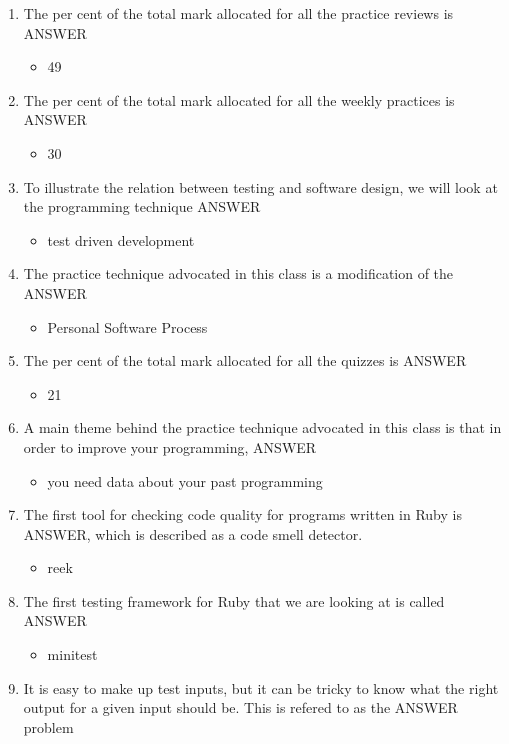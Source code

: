 \documentclass{exam}
\begin{document}
\begin{enumerate}
\item The per cent of the total mark allocated for all the practice reviews is ANSWER
\begin{itemize}
\item 49
\end{itemize}
\item The per cent of the total mark allocated for all the weekly practices is ANSWER
\begin{itemize}
\item 30
\end{itemize}
\item To illustrate the relation between testing and software design, we will look at the programming technique ANSWER
\begin{itemize}
\item test driven development
\end{itemize}
\item The practice technique advocated in this class is a modification of the ANSWER
\begin{itemize}
\item Personal Software Process
\end{itemize}
\item The per cent of the total mark allocated for all the quizzes is ANSWER
\begin{itemize}
\item 21
\end{itemize}
\item A main theme behind the practice technique advocated in this class is that in order to improve your programming, ANSWER
\begin{itemize}
\item you need data about your past programming
\end{itemize}
\item The first tool for checking code quality for programs written in Ruby is ANSWER, which is described as a code smell detector.
\begin{itemize}
\item reek
\end{itemize}
\item The first testing framework for Ruby that we are looking at is called ANSWER
\begin{itemize}
\item minitest
\end{itemize}
\item It is easy to make up test inputs, but it can be tricky to know what the right output for a given input should be.  This is refered to as the ANSWER problem

\end{enumerate}
\end{document}
